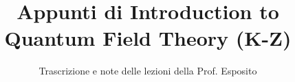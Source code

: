 \documentclass[a4paper,12pt]{article}
\title{Appunti di Introduction to Quantum Field Theory (K-Z)}
\author{Trascrizione e note delle lezioni della Prof. Esposito}
\date{}
\begin{document}
\maketitle
\projectintro
\tableofcontents
\newpage

\end{document}
